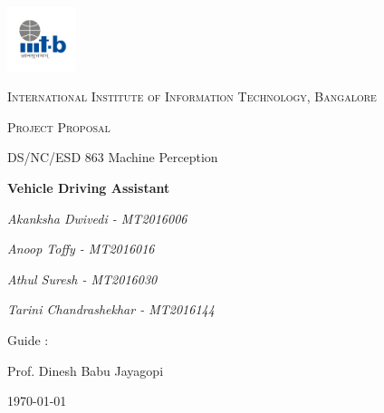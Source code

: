\documentclass[12pt,a4paper]{article}
\begin{document}
\begin{titlepage}
	\centering
	\includegraphics[width=0.15\textwidth]{IIIT-B_logo.jpg}\par\vspace{1cm}
	{\scshape\LARGE International Institute of Information Technology, Bangalore \par}
	\vspace{1cm}
	{\scshape\Large Project Proposal\par}
	{\Large DS/NC/ESD 863 Machine Perception\par}
	\vspace{1.5cm}
	{\huge\bfseries Vehicle Driving Assistant \par}
	\vspace{2cm}	   
	{\Large\itshape Akanksha Dwivedi - MT2016006\par}
	{\Large\itshape Anoop Toffy - MT2016016\par}
	{\Large\itshape Athul Suresh - MT2016030\par}
	{\Large\itshape Tarini Chandrashekhar - MT2016144\par}
	\vfill
	Guide : \par
	Prof. Dinesh Babu Jayagopi 

	\vfill

	{\large \today\par}
\end{titlepage}


\tableofcontents
\listoffigures
\listoftables
\newpage
\end{document}
